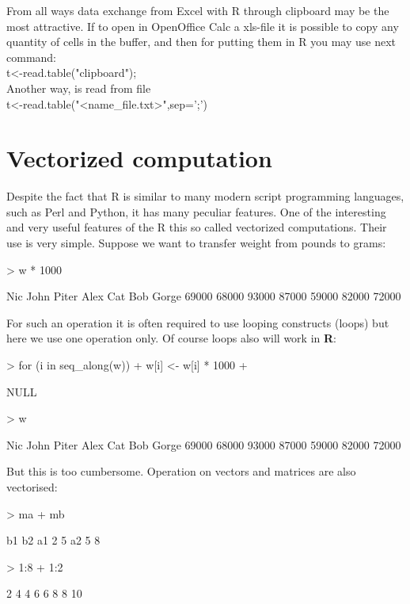 \documentclass[a4paper,11pt]{scrartcl}
\newcommand{\R}{{\sffamily\bfseries R}\xspace}
\begin{document}
From all ways data exchange from Excel with R through clipboard may be the most attractive. If to open in OpenOffice Calc a xls-file it is possible to copy any quantity of cells in the buffer, and then for  putting  them in R you may  use next command:\\
t<-read.table("clipboard");\\
Another way, is read from file\\
t<-read.table("<name_file.txt>",sep=';')\\




\section{Vectorized computation}
\label{sec:vectorcount}

Despite the fact that R is similar to many modern script programming languages, such as Perl and Python, it has many peculiar features. One of the interesting and very useful features of the R this so called vectorized computations. Their use is very simple. Suppose we want to transfer weight from pounds to grams:

\begin{Schunk}
\begin{Sinput}
> w * 1000
\end{Sinput}
\begin{Soutput}
  Nic  John Piter  Alex   Cat   Bob Gorge 
69000 68000 93000 87000 59000 82000 72000 
\end{Soutput}
\end{Schunk}

For such an operation it is often required to use looping constructs (loops) but here we use one operation only. Of course loops also will work in \R:
\begin{Schunk}
\begin{Sinput}
> for (i in seq_along(w)) {
+     w[i] <- w[i] * 1000
+ }
\end{Sinput}
\begin{Soutput}
NULL
\end{Soutput}
\begin{Sinput}
> w
\end{Sinput}
\begin{Soutput}
  Nic  John Piter  Alex   Cat   Bob Gorge 
69000 68000 93000 87000 59000 82000 72000 
\end{Soutput}
\end{Schunk}


But this is too cumbersome. Operation on vectors and matrices are also vectorised:
\begin{Schunk}
\begin{Sinput}
> ma + mb
\end{Sinput}
\begin{Soutput}
   b1 b2
a1  2  5
a2  5  8
\end{Soutput}
\begin{Sinput}
> 1:8 + 1:2
\end{Sinput}
\begin{Soutput}
[1]  2  4  4  6  6  8  8 10
\end{Soutput}
\end{Schunk}
\end{document}
